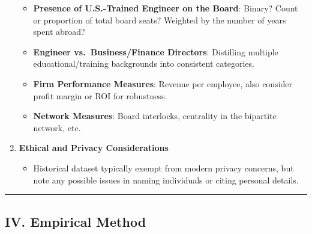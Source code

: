 \documentclass[
]{article}
\providecommand{\tightlist}{%
  \setlength{\itemsep}{0pt}\setlength{\parskip}{0pt}}\usepackage{longtable,booktabs,array}
\begin{document}
\begin{enumerate}
  \begin{itemize}
  \tightlist
  \item
    \textbf{Presence of U.S.-Trained Engineer on the Board}: Binary?
    Count or proportion of total board seats? Weighted by the number of
    years spent abroad?\\
  \item
    \textbf{Engineer vs.~Business/Finance Directors}: Distilling
    multiple educational/training backgrounds into consistent
    categories.\\
  \item
    \textbf{Firm Performance Measures}: Revenue per employee, also
    consider profit margin or ROI for robustness.\\
  \item
    \textbf{Network Measures}: Board interlocks, centrality in the
    bipartite network, etc.
  \end{itemize}
\item
  \textbf{Ethical and Privacy Considerations}

  \begin{itemize}
  \tightlist
  \item
    Historical dataset typically exempt from modern privacy concerns,
    but note any possible issues in naming individuals or citing
    personal details.
  \end{itemize}
\end{enumerate}

\begin{center}\rule{0.5\linewidth}{0.5pt}\end{center}

\subsection{IV. Empirical Method}\label{iv.-empirical-method}
\end{document}
